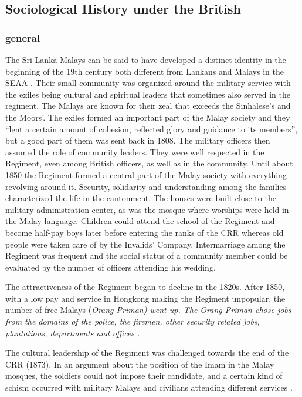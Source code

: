 \subsection{Sociological History under the British}\label{sec:slmbg:SociologicalHistoryundertheBritish}

\subsubsection{general}\label{sec:slmbg:general}
The Sri Lanka Malays can be said to have developed a distinct
identity in the beginning of the 19th century both different from
Lankans and Malays in the SEAA \citep[11]{Hussainmiya1987}. Their
small community was organized around the military service with the
exiles being cultural and spiritual leaders that sometimes also
served in the regiment. The Malays are known for their zeal that
exceeds the Sinhalese's and the Moors'. The exiles formed an
important part of the Malay society and they ``lent a certain
amount of cohesion, reflected glory and guidance to its
members''\citep[79]{Hussainmiya1990}, but a good part of them was
sent back in 1808. The military officers then assumed the role of
community leaders. They were well respected in the Regiment, even
among British officers, as well as in the community. Until about
1850 the Regiment formed a central part of the Malay society with
everything revolving around it. Security, solidarity and
understanding among the families characterized the life in the
cantonment. The houses were built close to the military
administration center, as was the mosque where worships were held
in the Malay language. Children could attend the school of the
Regiment and become half-pay boys later before entering the ranks
of the CRR whereas old people were taken care of by the Invalids'
Company. Intermarriage among the Regiment was frequent and the
social status of a community member could be evaluated by the
number of officers attending his wedding. 

The attractiveness of the Regiment began to decline in the 1820s.
After 1850, with a low pay and service in Hongkong making the
Regiment unpopular, the number of free Malays (\em Orang
Priman\em) went up. The \em Orang Priman \em chose jobs from the
domains of the police, the firemen, other security related jobs,
plantations, departments and offices \citep[90]{Hussainmiya1990}.

The cultural leadership of the Regiment was challenged towards the
end of the CRR (1873). In an argument about the position of the
Imam in the Malay mosques, the soldiers could not impose their
candidate, and a certain kind of schism occurred with military
Malays and civilians attending different services
\citet[125]{Hussainmiya1990}.

